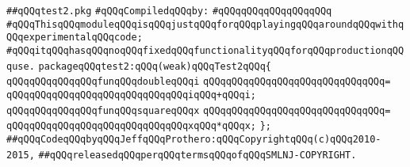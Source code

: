 \label{src/app/makelib/test/test2.pkg}
\verb|##qQQqtest2.pkg|\newline
\newline
\verb|#qQQqCompiledqQQqby:|\newline
\verb|#qQQqqQQqqQQqqQQqqQQq|\newline
\newline
\verb|#qQQqThisqQQqmoduleqQQqisqQQqjustqQQqforqQQqplayingqQQqaroundqQQqwithqQQqexperimentalqQQqcode;|\newline
\verb|#qQQqitqQQqhasqQQqnoqQQqfixedqQQqfunctionalityqQQqforqQQqproductionqQQquse.|\newline
\newline
\verb|packageqQQqtest2:qQQq(weak)qQQqTest2qQQq{|\newline
\newline
\verb|qQQqqQQqqQQqqQQqfunqQQqdoubleqQQqi|\newline
\verb|qQQqqQQqqQQqqQQqqQQqqQQqqQQqqQQq=|\newline
\verb|qQQqqQQqqQQqqQQqqQQqqQQqqQQqqQQqiqQQq+qQQqi;|\newline
\newline
\verb|qQQqqQQqqQQqqQQqfunqQQqsquareqQQqx|\newline
\verb|qQQqqQQqqQQqqQQqqQQqqQQqqQQqqQQq=|\newline
\verb|qQQqqQQqqQQqqQQqqQQqqQQqqQQqqQQqxqQQq*qQQqx;|\newline
\verb|};|\newline
\newline
\newline
\verb|##qQQqCodeqQQqbyqQQqJeffqQQqProthero:qQQqCopyrightqQQq(c)qQQq2010-2015,|\newline
\verb|##qQQqreleasedqQQqperqQQqtermsqQQqofqQQqSMLNJ-COPYRIGHT.|\newline

